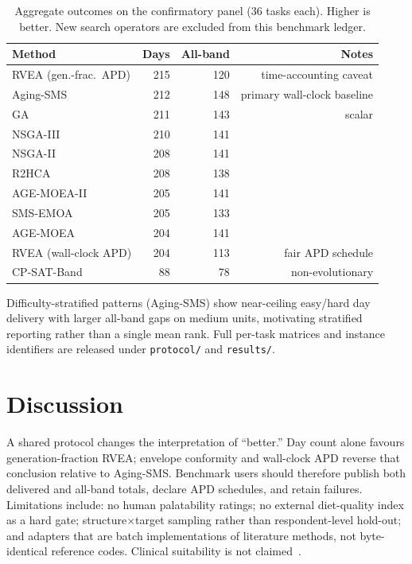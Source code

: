 \documentclass{ieeeaccess}
\begin{document}
\begin{table}[!t]
\caption{Aggregate outcomes on the confirmatory panel (36 tasks each). Higher is better. New search operators are excluded from this benchmark ledger.}
\label{tab:totals}
\centering
\begin{tabular}{@{}lrrr@{}}
\toprule
Method & Days & All-band & Notes \\
\midrule
RVEA (gen.-frac.\ APD) & 215 & 120 & time-accounting caveat \\
Aging-SMS & 212 & 148 & primary wall-clock baseline \\
GA & 211 & 143 & scalar \\
NSGA-III & 210 & 141 & \\
NSGA-II & 208 & 141 & \\
R2HCA & 208 & 138 & \\
AGE-MOEA-II & 205 & 141 & \\
SMS-EMOA & 205 & 133 & \\
AGE-MOEA & 204 & 141 & \\
RVEA (wall-clock APD) & 204 & 113 & fair APD schedule \\
CP-SAT-Band & 88 & 78 & non-evolutionary \\
\bottomrule
\end{tabular}
\end{table}

Difficulty-stratified patterns (Aging-SMS) show near-ceiling easy/hard day delivery with larger all-band gaps on medium units, motivating stratified reporting rather than a single mean rank. Full per-task matrices and instance identifiers are released under \texttt{protocol/} and \texttt{results/}.

\section{Discussion}
A shared protocol changes the interpretation of ``better.'' Day count alone favours generation-fraction RVEA; envelope conformity and wall-clock APD reverse that conclusion relative to Aging-SMS. Benchmark users should therefore publish both delivered and all-band totals, declare APD schedules, and retain failures. Limitations include: no human palatability ratings; no external diet-quality index as a hard gate; structure$\times$target sampling rather than respondent-level hold-out; and adapters that are batch implementations of literature methods, not byte-identical reference codes. Clinical suitability is not claimed~\cite{cdcEthics}.
\end{document}
